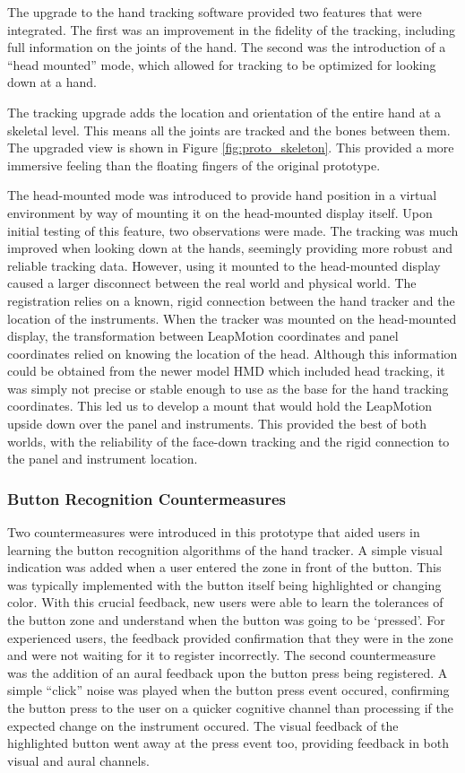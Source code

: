 The upgrade to the hand tracking software provided two features that were integrated.
The first was an improvement in the fidelity of the tracking, including full information on the joints of the hand.
The second was the introduction of a ``head mounted'' mode, which allowed for tracking to be optimized for looking down at a hand.

The tracking upgrade adds the location and orientation of the entire hand at a skeletal level.
This means all the joints are tracked and the bones between them.
The upgraded view is shown in Figure \ref{fig:proto_skeleton}.
This provided a more immersive feeling than the floating fingers of the original prototype.

The head-mounted mode was introduced to provide hand position in a virtual environment by way of mounting it on the head-mounted display itself.
Upon initial testing of this feature, two observations were made.
The tracking was much improved when looking down at the hands, seemingly providing more robust and reliable tracking data.
However, using it mounted to the head-mounted display caused a larger disconnect between the real world and physical world.
The registration relies on a known, rigid connection between the hand tracker and the location of the instruments.
When the tracker was mounted on the head-mounted display, the transformation between LeapMotion coordinates and panel coordinates relied on knowing the location of the head.
Although this information could be obtained from the newer model HMD which included head tracking, it was simply not precise or stable enough to use as the base for the hand tracking coordinates.
This led us to develop a mount that would hold the LeapMotion upside down over the panel and instruments.
This provided the best of both worlds, with the reliability of the face-down tracking and the rigid connection to the panel and instrument location.

\subsubsection{Button Recognition Countermeasures}

Two countermeasures were introduced in this prototype that aided users in learning the button recognition algorithms of the hand tracker.
A simple visual indication was added when a user entered the zone in front of the button.
This was typically implemented with the button itself being highlighted or changing color.
With this crucial feedback, new users were able to learn the tolerances of the button zone and understand when the button was going to be `pressed'.
For experienced users, the feedback provided confirmation that they were in the zone and were not waiting for it to register incorrectly.
The second countermeasure was the addition of an aural feedback upon the button press being registered.
A simple ``click'' noise was played when the button press event occured, confirming the button press to the user on a quicker cognitive channel than processing if the expected change on the instrument occured.
The visual feedback of the highlighted button went away at the press event too, providing feedback in both visual and aural channels.

